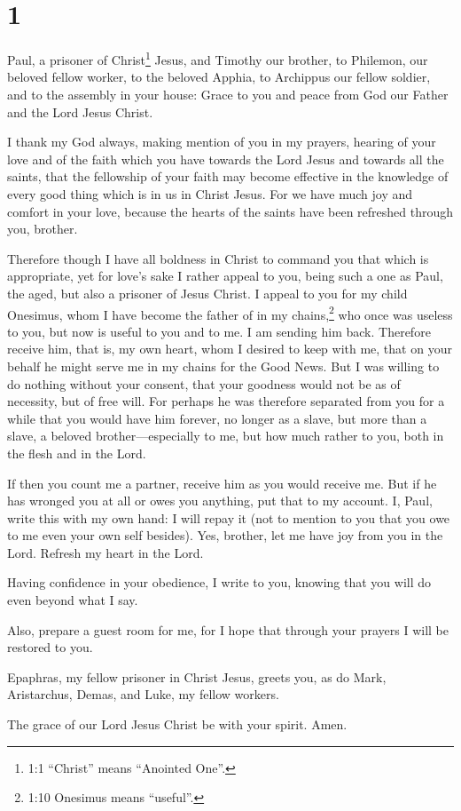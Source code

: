\hypertarget{section}{%
\section{1}\label{section}}

 Paul, a prisoner of Christ\footnote{1:1 ``Christ'' means
  ``Anointed One''.} Jesus, and Timothy our brother, to Philemon, our
beloved fellow worker,  to the beloved Apphia, to Archippus
our fellow soldier, and to the assembly in your house: 
Grace to you and peace from God our Father and the Lord Jesus Christ.

 I thank my God always, making mention of you in my prayers,
 hearing of your love and of the faith which you have
towards the Lord Jesus and towards all the saints,  that the
fellowship of your faith may become effective in the knowledge of every
good thing which is in us in Christ Jesus.  For we have much
joy and comfort in your love, because the hearts of the saints have been
refreshed through you, brother.

 Therefore though I have all boldness in Christ to command
you that which is appropriate,  yet for love's sake I rather
appeal to you, being such a one as Paul, the aged, but also a prisoner
of Jesus Christ.  I appeal to you for my child Onesimus,
whom I have become the father of in my chains,\footnote{1:10 Onesimus
  means ``useful''.}  who once was useless to you, but now
is useful to you and to me.  I am sending him back.
Therefore receive him, that is, my own heart,  whom I
desired to keep with me, that on your behalf he might serve me in my
chains for the Good News.  But I was willing to do nothing
without your consent, that your goodness would not be as of necessity,
but of free will.  For perhaps he was therefore separated
from you for a while that you would have him forever,  no
longer as a slave, but more than a slave, a beloved brother---especially
to me, but how much rather to you, both in the flesh and in the Lord.

 If then you count me a partner, receive him as you would
receive me.  But if he has wronged you at all or owes you
anything, put that to my account.  I, Paul, write this with
my own hand: I will repay it (not to mention to you that you owe to me
even your own self besides).  Yes, brother, let me have joy
from you in the Lord. Refresh my heart in the Lord.

 Having confidence in your obedience, I write to you,
knowing that you will do even beyond what I say.

 Also, prepare a guest room for me, for I hope that through
your prayers I will be restored to you.

 Epaphras, my fellow prisoner in Christ Jesus, greets you,
 as do Mark, Aristarchus, Demas, and Luke, my fellow
workers.

 The grace of our Lord Jesus Christ be with your spirit.
Amen.
